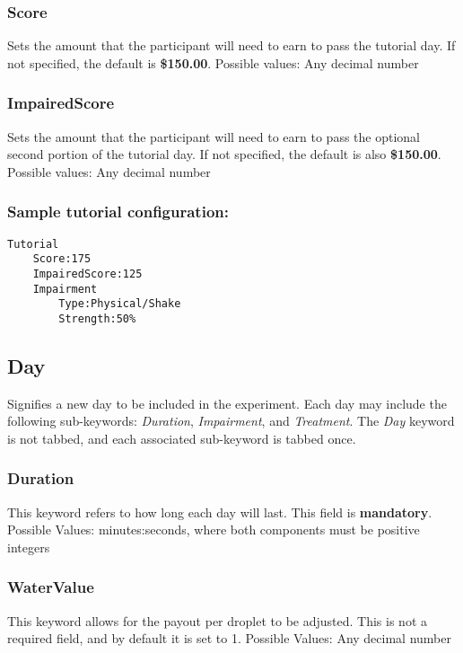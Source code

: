 \documentclass{article}
\begin{document}
\subsubsection*{Score} Sets the amount that the participant will need to earn to pass the tutorial day. If not specified, the default is \textbf{\$150.00}. \newline
\indent Possible values: \newline
\indent\indent Any decimal number

\pagebreak\subsubsection*{ImpairedScore} Sets the amount that the participant will need to earn to pass the optional second portion of the tutorial day. If not specified, the default is also \textbf{\$150.00}. \newline
\indent Possible values: \newline
\indent\indent Any decimal number

\subsubsection*{Sample tutorial configuration:}
\begin{lstlisting}
Tutorial
    Score:175
    ImpairedScore:125
    Impairment
        Type:Physical/Shake
        Strength:50%
\end{lstlisting}

\subsection*{Day}
Signifies a new day to be included in the experiment. Each day may include the following sub-keywords: \textit{Duration}, \textit{Impairment}, and \textit{Treatment}. The \textit{Day} keyword is not tabbed, and each associated sub-keyword is tabbed once.

\subsubsection*{Duration}
This keyword refers to how long each day will last. This field is \textbf{mandatory}. \newline
\indent Possible Values: \newline
\indent\indent minutes:seconds, where both components must be positive integers

\subsubsection*{WaterValue}
This keyword allows for the payout per droplet to be adjusted. This is not a required field, and by default it is set to 1. \newline
\indent Possible Values: \newline
\indent\indent Any decimal number
\end{document}
